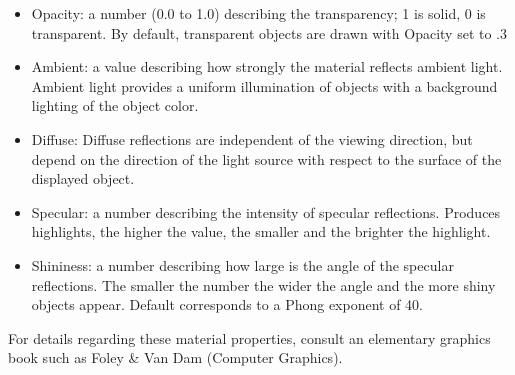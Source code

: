 \begin{itemize}
\item Opacity: a number (0.0 to 1.0) describing the transparency;
            1 is solid, 0 is transparent. By default, transparent objects 
	    are drawn with Opacity set to .3

\item Ambient: a value describing how strongly the material reflects 
            ambient light.  Ambient light
            provides a uniform illumination of objects with a
            background lighting of the object color. 
\item Diffuse: Diffuse reflections are independent of the viewing
            direction, but depend on the direction of the light source
            with respect to the surface of the displayed object.
\item Specular: a number describing the intensity of
             specular reflections. Produces highlights, the higher the 
	     value, the smaller and the brighter the highlight.
\item Shininess: a number describing how large is the angle of
              the specular reflections. The smaller the number the
              wider the angle and the more shiny objects appear.
              Default corresponds to a Phong exponent of 40.
\end{itemize}
For details regarding these material properties, consult an elementary
graphics book such as Foley \& Van Dam (Computer Graphics).  

